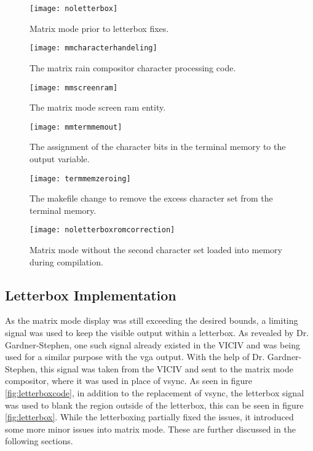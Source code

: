 \begin{figure}
  \centering
  \texttt{[image: noletterbox]}
  \caption{Matrix mode prior to letterbox fixes.}
  \label{fig:noletterbox}
\end{figure}

\begin{figure}
  \centering
  \texttt{[image: mmcharacterhandeling]}
  \caption{The matrix rain compositor character processing code.}
  \label{fig:mmcharacterhandeling}
\end{figure}

\begin{figure}
  \centering
  \texttt{[image: mmscreenram]}
  \caption{The matrix mode screen ram entity.}
  \label{fig:mmscreenram}
\end{figure}

\begin{figure}
  \centering
  \texttt{[image: mmtermmemout]}
  \caption{The assignment of the character bits in the terminal memory to the output variable.}
  \label{fig:mmtermmemout}
\end{figure}

\begin{figure}
  \centering
  \texttt{[image: termmemzeroing]}
  \caption{The makefile change to remove the excess character set from the terminal memory.}
  \label{fig:termmemzeroing}
\end{figure}

\begin{figure}
  \centering
  \texttt{[image: noletterboxromcorrection]}
  \caption{Matrix mode without the second character set loaded into memory during compilation.}
  \label{fig:noletterboxromcorrection}
\end{figure}


\subsection{Letterbox Implementation}

\label{Ch5 Sec2 Sub2}

As the matrix mode display was still exceeding the desired bounds, a limiting signal was used to keep the visible output within a letterbox. As revealed by Dr. Gardner-Stephen, one such signal already existed in the VICIV and was being used for a similar purpose with the vga output. With the help of Dr. Gardner-Stephen, this signal was taken from the VICIV and sent to the matrix mode compositor, where it was used in place of vsync. As seen in figure \ref{fig:letterboxcode}, in addition to the replacement of vsync, the letterbox signal was used to blank the region outside of the letterbox, this can be seen in figure \ref{fig:letterbox}. While the letterboxing partially fixed the issues, it introduced some more minor issues into matrix mode. These are further discussed in the following sections.

